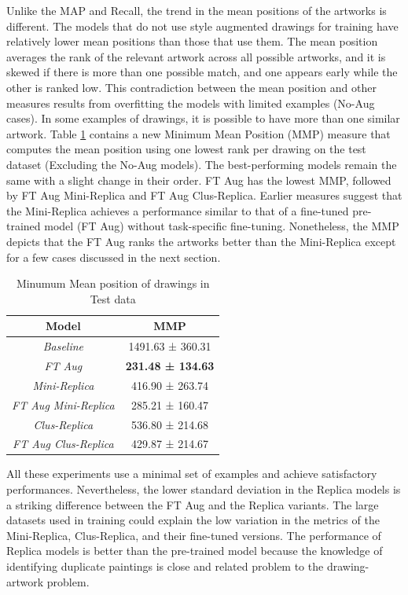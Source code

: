 Unlike the MAP and Recall, the trend in the mean positions of the artworks is different. The models that do not use style augmented drawings for training have relatively lower mean positions than those that use them. The mean position averages the rank of the relevant artwork across all possible artworks, and it is skewed if there is more than one possible match, and one appears early while the other is ranked low. This contradiction between the mean position and other measures results from overfitting the models with limited examples (No-Aug cases). In some examples of drawings, it is possible to have more than one similar artwork. Table \ref{tab:test-mmp} contains a new Minimum Mean Position (MMP) measure that computes the mean position using one lowest rank per drawing on the test dataset (Excluding the No-Aug models). The best-performing models remain the same with a slight change in their order. FT Aug has the lowest MMP, followed by FT Aug Mini-Replica and FT Aug Clus-Replica. Earlier measures suggest that the Mini-Replica achieves a performance similar to that of a fine-tuned pre-trained model (FT Aug) without task-specific fine-tuning. Nonetheless, the MMP depicts that the FT Aug ranks the artworks better than the Mini-Replica except for a few cases discussed in the next section.

\begin{table}[ht]
 \centering
    \begin{tabular}{c||c}
        \hline
        Model & {MMP} \\ \hline \hline
        \textit{Baseline} & 1491.63 ± 360.31 \\
        \textit{FT Aug} & \textbf{231.48 ± 134.63} \\
        \textit{Mini-Replica} & 416.90 ± 263.74 \\
        \textit{FT Aug Mini-Replica} & {285.21 ± 160.47} \\
        \textit{Clus-Replica} & 536.80 ± 214.68 \\
        \textit{FT Aug Clus-Replica} & 429.87 ± 214.67 \\
    \end{tabular}
    \caption{Minumum Mean position of drawings in Test data}
    \label{tab:test-mmp}
\end{table}

All these experiments use a minimal set of examples and achieve satisfactory performances. Nevertheless, the lower standard deviation in the Replica models is a striking difference between the FT Aug and the Replica variants. The large datasets used in training could explain the low variation in the metrics of the Mini-Replica, Clus-Replica, and their fine-tuned versions. The performance of Replica models is better than the pre-trained model because the knowledge of identifying duplicate paintings is close and related problem to the drawing-artwork problem.

